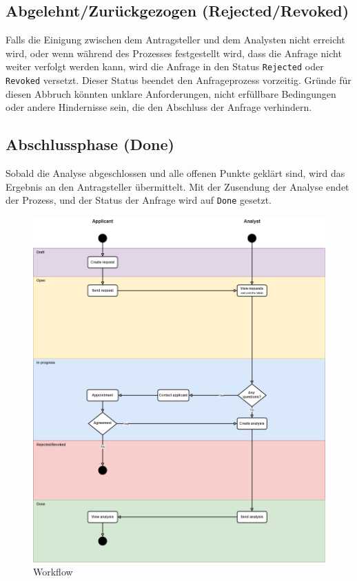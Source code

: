 \subsection*{Abgelehnt/Zur{\"u}ckgezogen (Rejected/Revoked)}
Falls die Einigung zwischen dem Antragsteller und dem Analysten nicht erreicht wird, oder wenn während des Prozesses festgestellt wird, dass die Anfrage nicht weiter verfolgt werden kann, wird die Anfrage in den Status \texttt{Rejected} oder \texttt{Revoked} versetzt. Dieser Status beendet den Anfrageprozess vorzeitig. Gründe für diesen Abbruch könnten unklare Anforderungen, nicht erfüllbare Bedingungen oder andere Hindernisse sein, die den Abschluss der Anfrage verhindern.
\subsection*{Abschlussphase (Done)}
Sobald die Analyse abgeschlossen und alle offenen Punkte geklärt sind, wird das Ergebnis an den Antragsteller übermittelt. Mit der Zusendung der Analyse endet der Prozess, und der Status der Anfrage wird auf \texttt{Done} gesetzt.
\newline
\begin{figure}[H]
    \centering
    \includegraphics[scale=.4]{media/Workflow}
    \caption{Workflow}
    \label{fig:Workflow}
\end{figure}
\newpage
